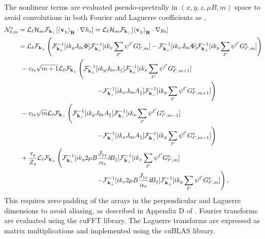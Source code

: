 \documentclass{jpp}
\begin{document}
The nonlinear terms are evaluated pseudo-spectrally in $(x,y,z,\mu B, m)$ space to avoid convolutions in both Fourier and Laguerre coefficients as \citep{Mandell2018},
\begin{align}
    \mathcal{N}_{\ell,m}^s &= \mathcal{L}_\ell \mathcal{H}_m \mathcal{F}_{\bf k_\perp} [\langle{  {\bf v}_{\chi} \rangle}_{\bf R}\cdot\nabla h_s] = \mathcal{L}_\ell \mathcal{H}_m \mathcal{F}_{\bf k_\perp} [\langle{  {\bf v}_{\chi} \rangle}_{\bf R}\cdot\nabla g_s] \notag \\
    &= \mathcal{L}_\ell \mathcal{F}_{\bf k_\perp}\left(\mathcal{F}_{\bf k_\perp}^{-1}[i k_y J_{0s}\Phi] \mathcal{F}_{\bf k_\perp}^{-1}[i k_x \sum_{\ell'} \psi^{\ell'} G^s_{\ell',m}] - \mathcal{F}_{\bf k_\perp}^{-1}[i k_x J_{0s}\Phi] \mathcal{F}_{\bf k_\perp}^{-1}[i k_y\sum_{\ell'} \psi^{\ell'} G^s_{\ell',m}] \right) \notag \\
    &\ - v_{ts}\sqrt{m+1}\mathcal{L}_\ell \mathcal{F}_{\bf k_\perp}\left(\mathcal{F}_{\bf k_\perp}^{-1}[i k_y J_{0s} A_\parallel] \mathcal{F}_{\bf k_\perp}^{-1}[i k_x \sum_{\ell'} \psi^{\ell'} G^s_{\ell',m+1}]\right.
    \notag \\ &\qquad\qquad\qquad\qquad\qquad\qquad
    \left.- \mathcal{F}_{\bf k_\perp}^{-1}[i k_x J_{0s} A_\parallel] \mathcal{F}_{\bf k_\perp}^{-1}[i k_y\sum_{\ell'} \psi^{\ell'} G^s_{\ell',m+1}] \right) \notag \\
    &\ - v_{ts}\sqrt{m}\mathcal{L}_\ell \mathcal{F}_{\bf k_\perp}\left(\mathcal{F}_{\bf k_\perp}^{-1}[i k_y J_{0s} A_\parallel] \mathcal{F}_{\bf k_\perp}^{-1}[i k_x \sum_{\ell'} \psi^{\ell'}  G^s_{\ell',m-1}]\right.
    \notag \\ &\qquad\qquad\qquad\qquad\qquad\qquad
    \left. - \mathcal{F}_{\bf k_\perp}^{-1}[i k_x J_{0s} A_\parallel] \mathcal{F}_{\bf k_\perp}^{-1}[i k_y\sum_{\ell'} \psi^{\ell'}  G^s_{\ell',m-1}] \right)\notag \\
    &\ +\frac{\tau_s}{Z_s}\mathcal{L}_\ell \mathcal{F}_{\bf k_\perp}\left(\mathcal{F}_{\bf k_\perp}^{-1}[i k_y 2\mu B \frac{J_{1s}}{\alpha_s}\delta\! B_\parallel] \mathcal{F}_{\bf k_\perp}^{-1}[i k_x \sum_{\ell'} \psi^{\ell'}  G^s_{\ell',m}] \right.
    \notag \\ &\qquad\qquad\qquad\qquad\qquad\qquad
    \left.- \mathcal{F}_{\bf k_\perp}^{-1}[i k_x 2\mu B \frac{J_{1s}}{\alpha_s}\delta\! B_\parallel] \mathcal{F}_{\bf k_\perp}^{-1}[i k_y \sum_{\ell'} \psi^{\ell'}  G^s_{\ell',m}] \right),
\end{align}
This requires zero-padding of the arrays in the perpendicular and Laguerre dimensions to avoid aliasing, as described in Appendix D of \cite{Mandell2018}. {\color{black} Fourier transforms are evaluated using the cuFFT library. The Laguerre transforms are expressed as matrix multiplications and implemented using the cuBLAS library.}
\end{document}
